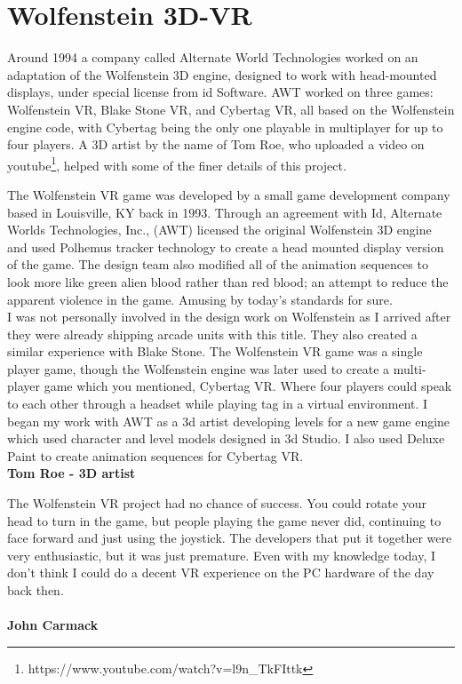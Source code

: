 \section{Wolfenstein 3D-VR}
Around 1994 a company called Alternate World Technologies worked on an adaptation of the Wolfenstein 3D engine, designed to work with head-mounted displays, under special license from id Software. AWT worked on three games: Wolfenstein VR, Blake Stone VR, and Cybertag VR, all based on the Wolfenstein engine code, with Cybertag being the only one playable in multiplayer for up to four players. A 3D artist by the name of Tom Roe, who uploaded a video on youtube\footnote{https://www.youtube.com/watch?v=l9n\_TkFIttk}, helped with some of the finer details of this project.\\

\begin{fancyquotes}
The Wolfenstein VR game was developed by a small game development company based in Louisville, KY back in 1993. Through an agreement with Id, Alternate Worlds Technologies, Inc., (AWT) licensed the original Wolfenstein 3D engine and used Polhemus tracker technology to create a head mounted display version of the game. The design team also modified all of the animation sequences to look more like green alien blood rather than red blood; an attempt to reduce the apparent violence in the game. Amusing by today's standards for sure.
 \bigskip \\
I was not personally involved in the design work on Wolfenstein as I arrived after they were already shipping arcade units with this title. They also created a similar experience with Blake Stone. The Wolfenstein VR game was a single player game, though the Wolfenstein engine was later used to create a multi-player game which you mentioned, Cybertag VR. Where four players could speak to each other through a headset while playing tag in a virtual environment. I began my work with AWT as a 3d artist developing levels for a new game engine which used character and level models designed in 3d Studio. I also used Deluxe Paint to create animation sequences for Cybertag VR.
 \bigskip \\
\textbf{Tom Roe - 3D artist}
 \end{fancyquotes}
\par

\par
\begin{fancyquotes}
The Wolfenstein VR project had no chance of success.  You could rotate your head to turn in the game, but people playing the game never did, continuing to face forward and just using the joystick.  The developers that put it together were very enthusiastic, but it was just premature.  Even with my knowledge today, I don't think I could do a decent VR experience on the PC hardware of the day back then.\\
\bigskip \\
\textbf{John Carmack}
 \end{fancyquotes}

